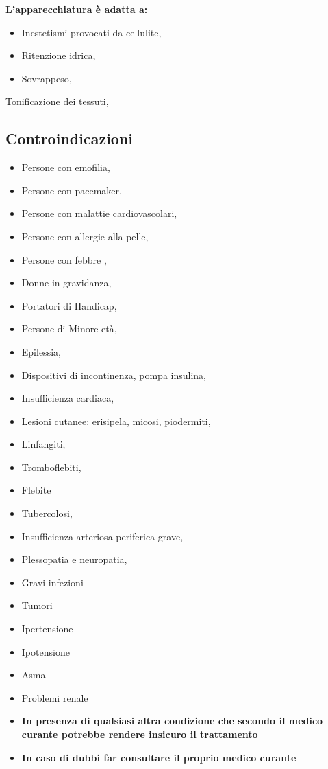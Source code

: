 \documentclass[a4paper]{article}
\begin{document}
\textbf{L'apparecchiatura è adatta a:}
\begin{itemize}
  \item Inestetismi provocati da cellulite,
  \item Ritenzione idrica,
  \item Sovrappeso,
\end{itemize}

Tonificazione dei tessuti,

\subsection{Controindicazioni}
\begin{itemize}
  \item Persone con emofilia,
  \item Persone con pacemaker,
  \item Persone con malattie cardiovascolari,
  \item Persone con allergie alla pelle,
  \item Persone con febbre ,
  \item Donne in gravidanza,
  \item Portatori di Handicap,
  \item Persone di Minore età,
  \item Epilessia,
  \item Dispositivi di incontinenza, pompa insulina,
  \item Insufficienza cardiaca,
  \item Lesioni cutanee: erisipela, micosi, piodermiti,
  \item Linfangiti,
  \item Tromboflebiti,
  \item Flebite
  \item Tubercolosi,
  \item Insufficienza arteriosa periferica grave,
  \item Plessopatia e neuropatia,
  \item Gravi infezioni
  \item Tumori
  \item Ipertensione
  \item Ipotensione
  \item Asma
  \item Problemi renale
  \item \textbf{In presenza di qualsiasi altra condizione che secondo il medico curante potrebbe rendere insicuro il trattamento}
  \item \textbf{In caso di dubbi far consultare il proprio medico curante}
\end{itemize}
\end{document}
